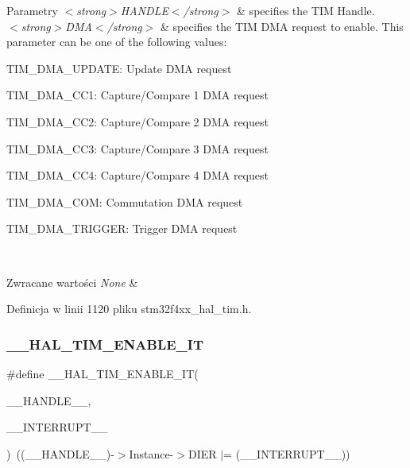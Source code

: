 \begin{DoxyParams}{Parametry}
{\em $<$strong$>$\+H\+A\+N\+D\+L\+E$<$/strong$>$} & specifies the T\+IM Handle. \\
\hline
{\em $<$strong$>$\+D\+M\+A$<$/strong$>$} & specifies the T\+IM D\+MA request to enable. This parameter can be one of the following values\+: \begin{DoxyItemize}
\item T\+I\+M\+\_\+\+D\+M\+A\+\_\+\+U\+P\+D\+A\+TE\+: Update D\+MA request \item T\+I\+M\+\_\+\+D\+M\+A\+\_\+\+C\+C1\+: Capture/\+Compare 1 D\+MA request \item T\+I\+M\+\_\+\+D\+M\+A\+\_\+\+C\+C2\+: Capture/\+Compare 2 D\+MA request \item T\+I\+M\+\_\+\+D\+M\+A\+\_\+\+C\+C3\+: Capture/\+Compare 3 D\+MA request \item T\+I\+M\+\_\+\+D\+M\+A\+\_\+\+C\+C4\+: Capture/\+Compare 4 D\+MA request \item T\+I\+M\+\_\+\+D\+M\+A\+\_\+\+C\+OM\+: Commutation D\+MA request \item T\+I\+M\+\_\+\+D\+M\+A\+\_\+\+T\+R\+I\+G\+G\+ER\+: Trigger D\+MA request \end{DoxyItemize}
\\
\hline
\end{DoxyParams}

\begin{DoxyRetVals}{Zwracane wartości}
{\em None} & \\
\hline
\end{DoxyRetVals}


Definicja w linii 1120 pliku stm32f4xx\+\_\+hal\+\_\+tim.\+h.

\mbox{\label{group___t_i_m___exported___macros_ga4d69943bc4716743c78e3194e259097e}} 
\subsubsection{\texorpdfstring{\+\_\+\+\_\+\+H\+A\+L\+\_\+\+T\+I\+M\+\_\+\+E\+N\+A\+B\+L\+E\+\_\+\+IT}{\_\_HAL\_TIM\_ENABLE\_IT}}
{\footnotesize\ttfamily \#define \+\_\+\+\_\+\+H\+A\+L\+\_\+\+T\+I\+M\+\_\+\+E\+N\+A\+B\+L\+E\+\_\+\+IT(\begin{DoxyParamCaption}\item[{}]{\+\_\+\+\_\+\+H\+A\+N\+D\+L\+E\+\_\+\+\_\+,  }\item[{}]{\+\_\+\+\_\+\+I\+N\+T\+E\+R\+R\+U\+P\+T\+\_\+\+\_\+ }\end{DoxyParamCaption})~((\+\_\+\+\_\+\+H\+A\+N\+D\+L\+E\+\_\+\+\_\+)-\/$>$Instance-\/$>$D\+I\+ER $\vert$= (\+\_\+\+\_\+\+I\+N\+T\+E\+R\+R\+U\+P\+T\+\_\+\+\_\+))}




